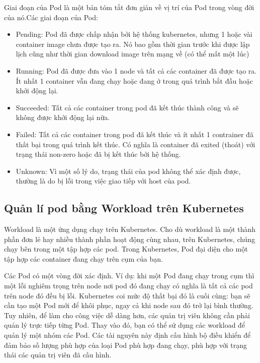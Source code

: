 \documentclass[14pt,a4paper]{book}
\begin{document}
				Giai đoạn của Pod là một bản tóm tắt đơn giản về vị trí của Pod trong vòng đời của nó.Các giai đoạn của Pod:
				\begin{itemize}				
					\item Pending: Pod đã được chấp nhận bởi hệ thống kubernetes, nhưng 1 hoặc vài container image chưa được tạo ra. Nó bao gồm thời gian trước khi được lập lịch cũng như thời gian download image trên mạng về (có thể mất một lúc)
					\item Running: Pod đã được đưa vào 1 node và tất cả các container đã được tạo ra. Ít nhất 1 container vẫn đang chạy hoặc đang ở trong quá trình bắt đầu hoặc khởi động lại.
					\item  Succeeded: Tất cả các container trong pod đã kết thúc thành công và sẽ không được khởi động lại nữa.
					\item  Failed: Tất cả các container trong pod đã kết thúc và ít nhất 1 contrainer đã thất bại trong quá trình kết thúc. Có nghĩa là container đã exited (thoát) với trạng thái non-zero hoặc đã bị kết thúc bởi hệ thống.
					\item  Unknown: Vì một số lý do, trạng thái của pod không thể xác định được, thường là do bị lỗi trong việc giao tiếp với host của pod.
				\end{itemize}
			\subsection{Quản lí pod bằng Workload trên Kubernetes}
				{\hspace{0.6cm}Workload là một ứng dụng chạy trên Kubernetes. Cho dù workload là một thành phần đơn lẻ hay nhiều thành phần hoạt động cùng nhau, trên Kubernetes, chúng chạy bên trong một tập hợp các pod. Trong Kubernetes, Pod đại diện cho một tập hợp các container đang chạy trên cụm của bạn.\\}
				
				Các Pod có một vòng đời xác định. Ví dụ: khi một Pod đang chạy trong cụm thì một lỗi nghiêm trọng trên node nơi pod đó đang chạy có nghĩa là tất cả các pod trên node đó đều bị lỗi. Kubernetes coi mức độ thất bại đó là cuối cùng: bạn sẽ cần tạo một Pod mới để khôi phục, ngay cả khi node sau đó trở lại bình thường.\\
				
				Tuy nhiên, để làm cho công việc dễ dàng hơn, các quản trị viên không cần phải quản lý trực tiếp từng Pod. Thay vào đó, bạn có thể sử dụng các workload để quản lý một nhóm các Pod. Các tài nguyên này định cấu hình bộ điều khiển để đảm bảo số lượng phù hợp của loại Pod phù hợp đang chạy, phù hợp với trạng thái các quản trị viên đã cấu hình.\\
				
\end{document}
